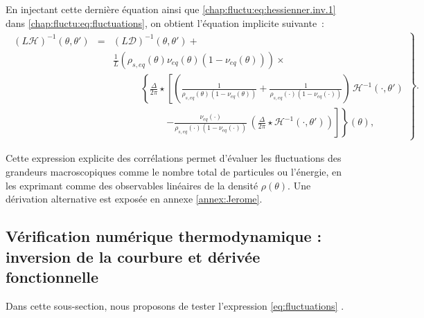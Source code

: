 En injectant cette dernière équation ainsi que \eqref{chap:fluctu:eq:hessienner.inv.1} dans \eqref{chap:fluctu:eq:fluctuations}, on obtient l'équation implicite suivante~:
\begin{eqnarray}
	\left . \begin{array}{rcl}
		\left( L \mathcal{H} \right)^{-1} (\theta, \theta') & = &\displaystyle (L\mathcal{D})^{-1}(\theta , \theta') + \\&& 	\frac{1}{L} (\rho_{\! s , eq}(\theta) \nu_{\! eq}(\theta) (1 -  \nu_{\! eq}(\theta) )) \times \\
		&& \displaystyle  ~~~~~~~~~~~~~\left \{  \frac{\Delta}{2\pi} \star  \left [ \left (  \frac{1}{\rho_{\! s, eq}(\theta)  (1 - \nu_{\! eq}(\theta)  )} +  \frac{1}{\rho_{\! s, eq}(\cdot) (1 - \nu_{\! eq} (\cdot )  )}\right )  \, \mathcal{H}^{-1}( \cdot , \theta ' )   \right. \right .\\
		&&  \displaystyle  ~~~~~~~~~~~~~~~~~~~~~~~~~\left . \left .   -  \frac{\nu_{\! eq}(\cdot)}{\rho_{\! s, eq}(\cdot) ( 1 - \nu_{\! eq}(\cdot) )}  \, \left ( \frac{\Delta}{2\pi} \star \mathcal{H}^{-1}( \cdot , \theta ' )   \right )  \right ] \right \} (\theta),
	\end{array}\right\}. \label{chap:fluctu:eq:fluctuations.10}
\end{eqnarray}


Cette expression explicite des corrélations permet d'évaluer les fluctuations des grandeurs macroscopiques comme le nombre total de particules ou l'énergie, en les exprimant comme des observables linéaires de la densité \( \rho(\theta) \). Une dérivation alternative est exposée en annexe \ref{annex:Jerome}.

\subsection{Vérification numérique thermodynamique : inversion de la courbure et dérivée fonctionnelle}



Dans cette sous-section, nous proposons de tester l’expression \eqref{eq:fluctuations} .%


